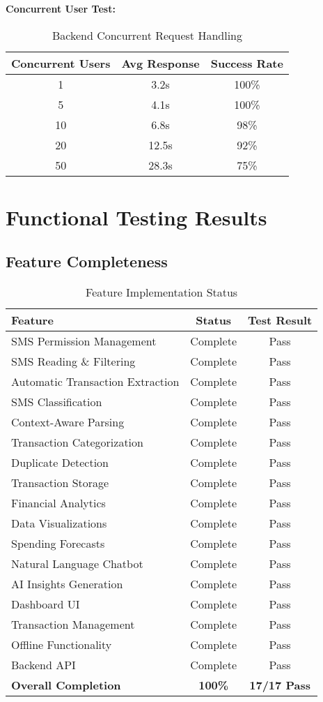 \documentclass[11pt,a4paper]{report}
\begin{document}
\textbf{Concurrent User Test:}
\begin{table}[H]
\centering
\caption{Backend Concurrent Request Handling}
\begin{tabular}{|c|c|c|}
\hline
\textbf{Concurrent Users} & \textbf{Avg Response} & \textbf{Success Rate} \\
\hline
1 & 3.2s & 100\% \\
5 & 4.1s & 100\% \\
10 & 6.8s & 98\% \\
20 & 12.5s & 92\% \\
50 & 28.3s & 75\% \\
\hline
\end{tabular}
\end{table}

\section{Functional Testing Results}

\subsection{Feature Completeness}

\begin{table}[H]
\centering
\caption{Feature Implementation Status}
\begin{tabular}{|l|c|c|}
\hline
\textbf{Feature} & \textbf{Status} & \textbf{Test Result} \\
\hline
SMS Permission Management & Complete & Pass \\
SMS Reading \& Filtering & Complete & Pass \\
Automatic Transaction Extraction & Complete & Pass \\
SMS Classification & Complete & Pass \\
Context-Aware Parsing & Complete & Pass \\
Transaction Categorization & Complete & Pass \\
Duplicate Detection & Complete & Pass \\
Transaction Storage & Complete & Pass \\
Financial Analytics & Complete & Pass \\
Data Visualizations & Complete & Pass \\
Spending Forecasts & Complete & Pass \\
Natural Language Chatbot & Complete & Pass \\
AI Insights Generation & Complete & Pass \\
Dashboard UI & Complete & Pass \\
Transaction Management & Complete & Pass \\
Offline Functionality & Complete & Pass \\
Backend API & Complete & Pass \\
\hline
\textbf{Overall Completion} & \textbf{100\%} & \textbf{17/17 Pass} \\
\hline
\end{tabular}
\end{table}
\end{document}
